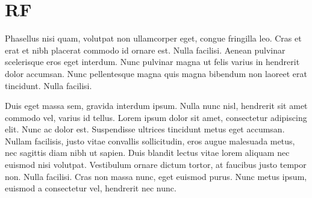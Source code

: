\section{RF}

Phasellus nisi quam, volutpat non ullamcorper eget, congue fringilla leo. Cras et erat et nibh placerat commodo id ornare est. Nulla facilisi. Aenean pulvinar scelerisque eros eget interdum. Nunc pulvinar magna ut felis varius in hendrerit dolor accumsan. Nunc pellentesque magna quis magna bibendum non laoreet erat tincidunt. Nulla facilisi.

Duis eget massa sem, gravida interdum ipsum. Nulla nunc nisl, hendrerit sit amet commodo vel, varius id tellus. Lorem ipsum dolor sit amet, consectetur adipiscing elit. Nunc ac dolor est. Suspendisse ultrices tincidunt metus eget accumsan. Nullam facilisis, justo vitae convallis sollicitudin, eros augue malesuada metus, nec sagittis diam nibh ut sapien. Duis blandit lectus vitae lorem aliquam nec euismod nisi volutpat. Vestibulum ornare dictum tortor, at faucibus justo tempor non. Nulla facilisi. Cras non massa nunc, eget euismod purus. Nunc metus ipsum, euismod a consectetur vel, hendrerit nec nunc.

